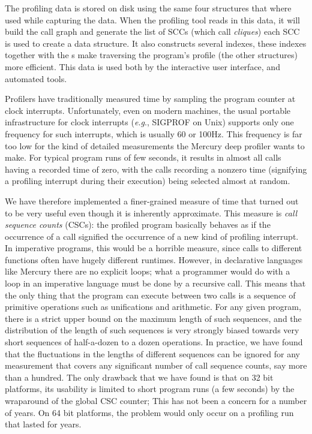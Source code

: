 \noindent
The profiling data is stored on disk using the same four structures that
where used while capturing the data.
When the profiling tool reads in this data,
it will build the call graph and generate the list of SCCs
(which \citet*{conway:2001:mercury-deep} call \emph{cliques})
each SCC is used to create a \Clique data structure.
It also constructs several indexes,
these indexes together with the {\Clique}s make traversing the program's
profile (the other structures) more efficient.
This data is used both by
the interactive user interface,
and automated tools.

Profilers have traditionally measured time
by sampling the program counter at clock interrupts.
Unfortunately, even on modern machines,
the usual portable infrastructure for clock interrupts
(\emph{e.g}., SIGPROF on Unix)
supports only one frequency for such interrupts,
which is usually 60 or 100Hz.
This frequency is far too low for the kind of detailed measurements
the Mercury deep profiler wants to make.
For typical program runs of few seconds,
it results in almost all calls having a recorded time of zero,
with the calls recording a nonzero time
(signifying a profiling interrupt during their execution)
being selected almost at random.

We have therefore implemented a finer-grained measure of time
that turned out to be very useful
even though it is inherently approximate.
This measure is \emph{call sequence counts} (CSCs):
the profiled program basically behaves
as if the occurrence of a call signified
the occurrence of a new kind of profiling interrupt.
In imperative programs, this would be a horrible measure,
since calls to different functions often have hugely different runtimes.
However, in declarative languages like Mercury there are no explicit loops;
what a programmer would do with a loop in an imperative language
must be done by a recursive call.
This means that the only thing that the program can execute between two calls
is a sequence of primitive operations such as unifications and arithmetic.
For any given program,
there is a strict upper bound on the maximum length of such sequences,
and the distribution of the length of such sequences
is very strongly biased towards very short sequences
of half-a-dozen to a dozen operations.
In practice, we have found that
the fluctuations in the lengths of different sequences
can be ignored for any measurement
that covers any significant number of call sequence counts,
say more than a hundred.
The only drawback that we have found is that on 32 bit platforms,
its usability is limited to short program runs (a few seconds)
by the wraparound of the global CSC counter;
This has not been a concern for a number of years.
On 64 bit platforms, the problem would only occur
on a profiling run that lasted for years.


